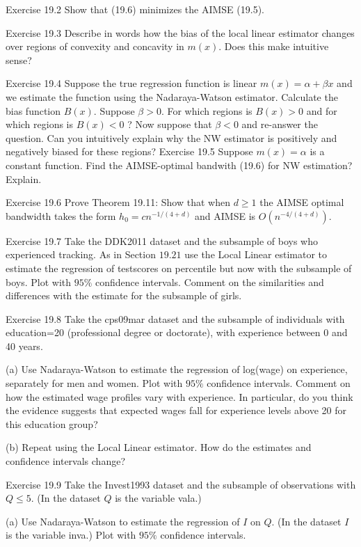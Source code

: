 \documentclass[10pt]{article}
\begin{document}
Exercise 19.2 Show that (19.6) minimizes the AIMSE (19.5).

Exercise 19.3 Describe in words how the bias of the local linear estimator changes over regions of convexity and concavity in $m(x)$. Does this make intuitive sense?

Exercise 19.4 Suppose the true regression function is linear $m(x)=\alpha+\beta x$ and we estimate the function using the Nadaraya-Watson estimator. Calculate the bias function $B(x)$. Suppose $\beta>0$. For which regions is $B(x)>0$ and for which regions is $B(x)<0$ ? Now suppose that $\beta<0$ and re-answer the question. Can you intuitively explain why the NW estimator is positively and negatively biased for these regions? Exercise 19.5 Suppose $m(x)=\alpha$ is a constant function. Find the AIMSE-optimal bandwith (19.6) for NW estimation? Explain.

Exercise 19.6 Prove Theorem 19.11: Show that when $d \geq 1$ the AIMSE optimal bandwidth takes the form $h_{0}=c n^{-1 /(4+d)}$ and AIMSE is $O\left(n^{-4 /(4+d)}\right)$.

Exercise 19.7 Take the DDK2011 dataset and the subsample of boys who experienced tracking. As in Section $19.21$ use the Local Linear estimator to estimate the regression of testscores on percentile but now with the subsample of boys. Plot with $95 \%$ confidence intervals. Comment on the similarities and differences with the estimate for the subsample of girls.

Exercise 19.8 Take the cps09mar dataset and the subsample of individuals with education=20 (professional degree or doctorate), with experience between 0 and 40 years.

(a) Use Nadaraya-Watson to estimate the regression of log(wage) on experience, separately for men and women. Plot with $95 \%$ confidence intervals. Comment on how the estimated wage profiles vary with experience. In particular, do you think the evidence suggests that expected wages fall for experience levels above 20 for this education group?

(b) Repeat using the Local Linear estimator. How do the estimates and confidence intervals change?

Exercise 19.9 Take the Invest1993 dataset and the subsample of observations with $Q \leq 5$. (In the dataset $Q$ is the variable vala.)

(a) Use Nadaraya-Watson to estimate the regression of $I$ on $Q$. (In the dataset $I$ is the variable inva.) Plot with $95 \%$ confidence intervals.
\end{document}
